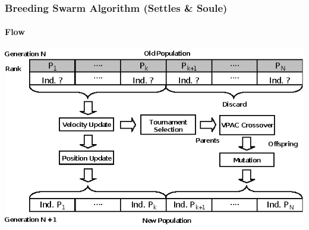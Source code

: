 \documentclass{beamer}
\begin{document}
\begin{frame}
  \frametitle{Breeding Swarm Algorithm (Settles \& Soule)}
  \framesubtitle{Flow}
  \includegraphics[scale=1.2]{bs}
\end{frame}
\end{document}
